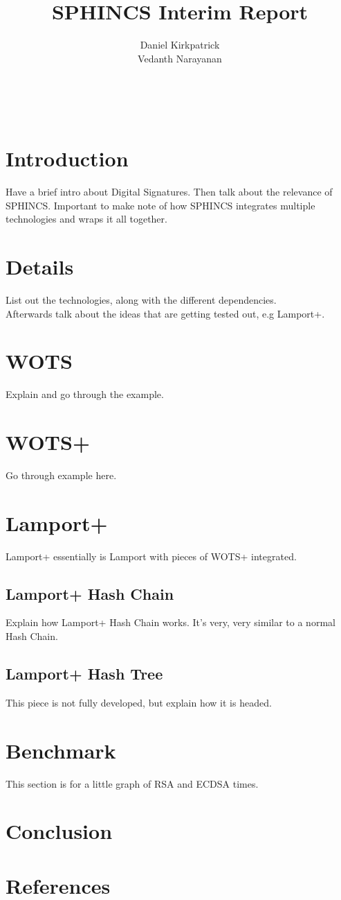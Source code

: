 \documentclass[]{scrartcl}
\title{SPHINCS Interim Report}
\author{Daniel Kirkpatrick\\Vedanth Narayanan}
\makeatletter
\renewcommand{\maketitle}{ %
	\begin{center} %
		{\LARGE\@title} %
		
		\vspace{15pt} %
		{\large\@author} %
		\\\@date %
		
	\end{center}
}
\makeatother
\begin{document}
\maketitle


\section*{Introduction}
Have a brief intro about Digital Signatures. Then talk about the relevance of SPHINCS. Important to make note of how SPHINCS integrates multiple technologies and wraps it all together.

\section*{Details}
List out the technologies, along with the different dependencies.\\
Afterwards talk about the ideas that are getting tested out, e.g Lamport+.

\section*{WOTS}
Explain and go through the example.

\section*{WOTS+}
Go through example here.

\section*{Lamport+}
Lamport+ essentially is Lamport with pieces of WOTS+ integrated.

\subsection*{Lamport+ Hash Chain}
Explain how Lamport+ Hash Chain works. It's very, very similar to a normal Hash Chain.

\subsection*{Lamport+ Hash Tree}
This piece is not fully developed, but explain how it is headed.

\section*{Benchmark}
This section is for a little graph of RSA and ECDSA times.

\section*{Conclusion}

\section*{References}
\end{document}
